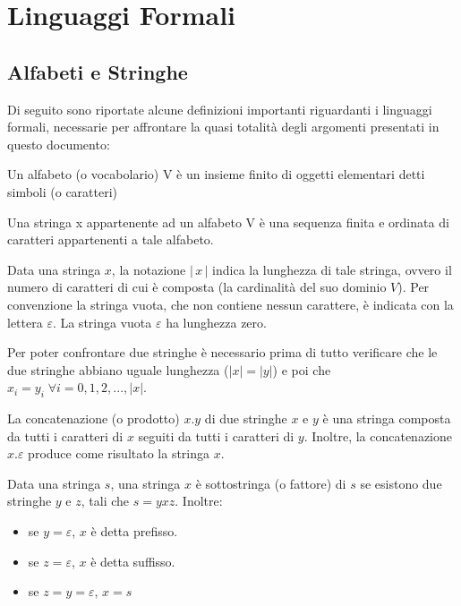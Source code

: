 \chapter{Linguaggi Formali}

  \section{Alfabeti e Stringhe}
  Di seguito sono riportate alcune definizioni importanti riguardanti i linguaggi formali, necessarie per affrontare la quasi totalità degli argomenti presentati in questo documento:
  \begin{definition}[Alfabeto]
    Un alfabeto (o vocabolario) V è un insieme finito di oggetti elementari detti simboli (o caratteri)
  \end{definition} 

  \begin{definition} [Stringa]
    Una stringa x appartenente ad un alfabeto V è una sequenza finita e ordinata di caratteri appartenenti a tale alfabeto.
  \end{definition}

  Data una stringa \(x\), la notazione \(|\,x\,|\) indica la lunghezza di tale stringa, ovvero il numero di caratteri di cui è composta (la cardinalità del suo dominio \(V\)). Per convenzione la stringa vuota, che non contiene nessun carattere, è indicata con la lettera \(\varepsilon\). La stringa vuota \(\varepsilon\) ha lunghezza zero. 

  Per poter confrontare due stringhe è necessario prima di tutto verificare che le due stringhe abbiano uguale lunghezza (\(|x| = |y|\)) e poi che \(x_i = y_i\; \forall i=0,1,2,...,|x|\).

  La concatenazione (o prodotto) \(x.y\) di due stringhe \(x\) e \(y\) è una stringa composta da tutti i caratteri di \(x\) seguiti da tutti i caratteri di \(y\). Inoltre, la concatenazione \(x.\varepsilon\) produce come risultato la stringa \(x\).

  Data una stringa \(s\), una stringa \(x\) è sottostringa (o fattore) di \(s\) se esistono due stringhe \(y\) e \(z\), tali che \(s=yxz\). Inoltre:
  \begin{itemize}
    \item se \(y=\varepsilon\), \(x\) è detta prefisso.
    \item se \(z=\varepsilon\), \(x\) è detta suffisso.
    \item se \(z=y=\varepsilon\), \(x=s\)
  \end{itemize}

